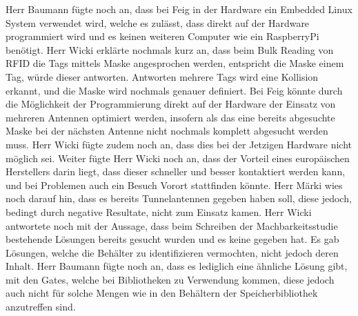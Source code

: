\documentclass[parskip=full, a4paper]{scrreprt}
\begin{document}
Herr Baumann fügte noch an, dass bei Feig in der Hardware ein Embedded Linux System verwendet wird, welche es zulässt, dass direkt auf der Hardware programmiert wird und es keinen weiteren Computer wie ein RaspberryPi benötigt. Herr Wicki erklärte nochmals kurz an, dass beim Bulk Reading von RFID die Tags mittels Maske angesprochen werden, entspricht die Maske einem Tag, würde dieser antworten. Antworten mehrere Tags wird eine Kollision erkannt, und die Maske wird nochmals genauer definiert. Bei Feig könnte durch die Möglichkeit der Programmierung direkt auf der Hardware der Einsatz von mehreren Antennen optimiert werden, insofern als das eine bereits abgesuchte Maske bei der nächsten Antenne nicht nochmals komplett abgesucht werden muss. Herr Wicki fügte zudem noch an, dass dies bei der Jetzigen Hardware nicht möglich sei.
Weiter fügte Herr Wicki noch an, dass der Vorteil eines europäischen Herstellers darin liegt, dass dieser schneller und besser kontaktiert werden kann, und bei Problemen auch ein Besuch Vorort stattfinden könnte.
Herr Märki wies noch darauf hin, dass es bereits Tunnelantennen gegeben haben soll, diese jedoch, bedingt durch negative Resultate, nicht zum Einsatz kamen.
Herr Wicki antwortete noch mit der Aussage, dass beim Schreiben der Machbarkeitsstudie bestehende Lösungen bereits gesucht wurden und es keine gegeben hat. Es gab Lösungen, welche die Behälter zu identifizieren vermochten, nicht jedoch deren Inhalt. Herr Baumann fügte noch an, dass es lediglich eine ähnliche Lösung gibt, mit den Gates, welche bei Bibliotheken zu Verwendung kommen, diese jedoch auch nicht für solche Mengen wie in den Behältern der Speicherbibliothek anzutreffen sind.
\end{document}
